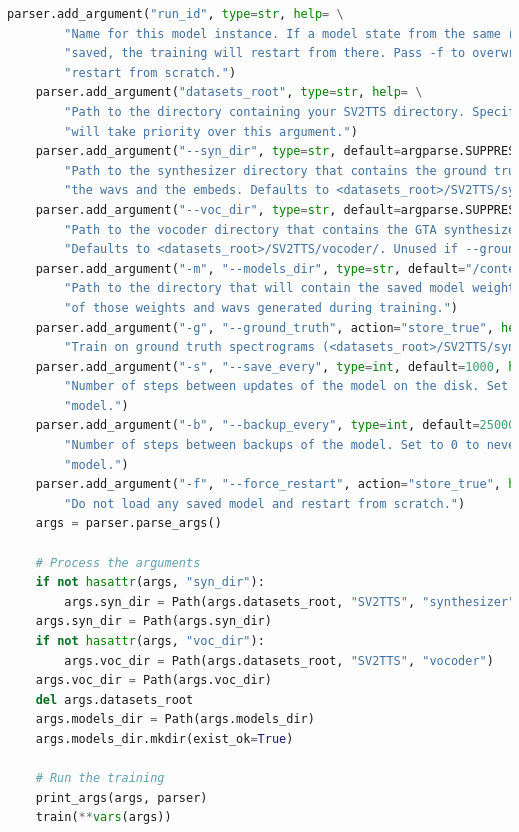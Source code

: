 \begin{enumerate}
\begin{lstlisting}[language=Python, caption=Vocoder Train]
    parser.add_argument("run_id", type=str, help= \
        "Name for this model instance. If a model state from the same run ID was previously "
        "saved, the training will restart from there. Pass -f to overwrite saved states and "
        "restart from scratch.")
    parser.add_argument("datasets_root", type=str, help= \
        "Path to the directory containing your SV2TTS directory. Specifying --syn_dir or --voc_dir "
        "will take priority over this argument.")
    parser.add_argument("--syn_dir", type=str, default=argparse.SUPPRESS, help= \
        "Path to the synthesizer directory that contains the ground truth mel spectrograms, "
        "the wavs and the embeds. Defaults to <datasets_root>/SV2TTS/synthesizer/.")
    parser.add_argument("--voc_dir", type=str, default=argparse.SUPPRESS, help= \
        "Path to the vocoder directory that contains the GTA synthesized mel spectrograms. "
        "Defaults to <datasets_root>/SV2TTS/vocoder/. Unused if --ground_truth is passed.")
    parser.add_argument("-m", "--models_dir", type=str, default="/content/drive/MyDrive/ColabNotebooks/Real-Time-Voice-Cloning/vocoder/saved_models/", help=\
        "Path to the directory that will contain the saved model weights, as well as backups "
        "of those weights and wavs generated during training.")
    parser.add_argument("-g", "--ground_truth", action="store_true", help= \
        "Train on ground truth spectrograms (<datasets_root>/SV2TTS/synthesizer/mels).")
    parser.add_argument("-s", "--save_every", type=int, default=1000, help= \
        "Number of steps between updates of the model on the disk. Set to 0 to never save the "
        "model.")
    parser.add_argument("-b", "--backup_every", type=int, default=25000, help= \
        "Number of steps between backups of the model. Set to 0 to never make backups of the "
        "model.")
    parser.add_argument("-f", "--force_restart", action="store_true", help= \
        "Do not load any saved model and restart from scratch.")
    args = parser.parse_args()

    # Process the arguments
    if not hasattr(args, "syn_dir"):
        args.syn_dir = Path(args.datasets_root, "SV2TTS", "synthesizer")
    args.syn_dir = Path(args.syn_dir)
    if not hasattr(args, "voc_dir"):
        args.voc_dir = Path(args.datasets_root, "SV2TTS", "vocoder")
    args.voc_dir = Path(args.voc_dir)
    del args.datasets_root
    args.models_dir = Path(args.models_dir)
    args.models_dir.mkdir(exist_ok=True)

    # Run the training
    print_args(args, parser)
    train(**vars(args))
    

\end{lstlisting}
\end{enumerate}
